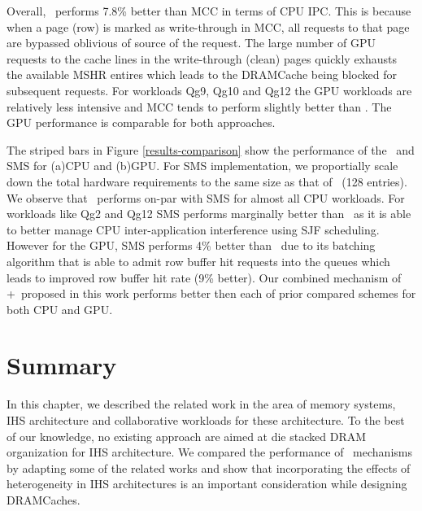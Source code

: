 \par Overall, \bypassname\ performs 7.8\% better than MCC in terms of CPU IPC. This is because when a page (row) is marked as write-through in MCC, all requests to that page are bypassed oblivious of source of the request. The large number of GPU requests to the cache lines in the write-through (clean) pages quickly exhausts the available MSHR entires which leads to the DRAMCache being blocked for subsequent requests. For workloads Qg9, Qg10 and Qg12 the GPU workloads are relatively less intensive and MCC tends to perform slightly better than \bypassname. The GPU performance is comparable for both approaches.
\par The striped bars in Figure \ref{results-comparison} show the performance of the \prioname\ and SMS for (a)CPU and (b)GPU. For SMS implementation, we proportially scale down the total hardware requirements to the same size as that of \prioname\ (128 entries). We observe that \prioname\ performs on-par with SMS for almost all CPU workloads. For workloads like Qg2 and Qg12 SMS performs marginally better than \prioname\ as it is able to better manage CPU inter-application interference using SJF scheduling. However for the GPU, SMS performs 4\% better than \prioname\ due to its batching algorithm that is able to admit row buffer hit requests into the queues which leads to improved row buffer hit rate (9\% better). Our combined mechanism of \prioname+\bypassname\ proposed in this work performs better then each of prior compared schemes for both CPU and GPU.

\section{Summary}
In this chapter, we described the related work in the area of memory systems, IHS architecture and collaborative workloads for these architecture. To the best of our knowledge, no existing approach are aimed at die stacked DRAM organization for IHS architecture. We compared the performance of \cachename\ mechanisms by adapting some of the related works and show that incorporating the effects of heterogeneity in IHS architectures is an important consideration while designing DRAMCaches.